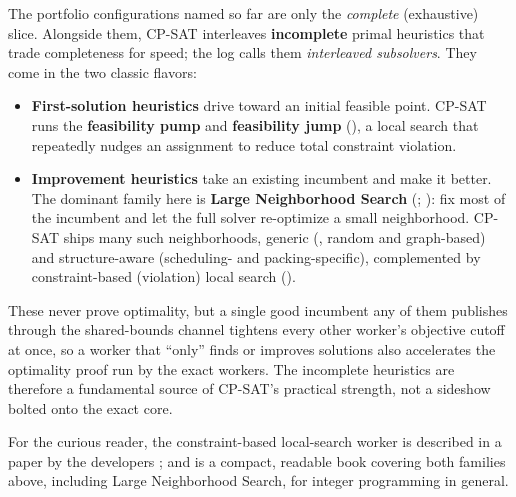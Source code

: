 \begin{platypuswarning}
The portfolio configurations named so far are only the \emph{complete} (exhaustive) slice. Alongside them,
CP-SAT interleaves \textbf{incomplete} primal heuristics that trade completeness
for speed; the log calls them \emph{interleaved subsolvers}. They come in the two
classic flavors:
\begin{itemize}
  \item \textbf{First-solution heuristics} drive toward an initial feasible
  point. CP-SAT runs the \textbf{feasibility pump} and \textbf{feasibility jump}
  (), a local
  search that repeatedly nudges an assignment to reduce total constraint
  violation.
  \item \textbf{Improvement heuristics} take an existing incumbent and make it
  better. The dominant family here is \textbf{Large Neighborhood Search}
  (; ): fix most of the incumbent and let the full
  solver re-optimize a small neighborhood. CP-SAT ships many such neighborhoods,
  generic (, random and graph-based) and structure-aware
  (scheduling- and packing-specific), complemented by constraint-based
  (violation) local search ().
\end{itemize}
These never prove optimality, but a single good incumbent any of them publishes
through the shared-bounds channel tightens every other worker's objective cutoff
at once, so a worker that ``only'' finds or improves solutions also accelerates
the optimality proof run by the exact workers. The incomplete heuristics are
therefore a fundamental source of CP-SAT's practical strength, not a sideshow
bolted onto the exact core.

For the curious reader, the constraint-based local-search worker is described in
a paper by the developers \cite{davies2024violationls}; and \cite{berthold2025primal}
is a compact, readable book covering both families above, including Large
Neighborhood Search, for integer programming in general.
\end{platypuswarning}

